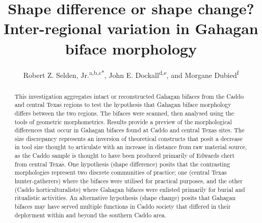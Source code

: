 \documentclass[review]{elsarticle}
\begin{document}
\begin{frontmatter}


\title{Shape difference or shape change? Inter-regional variation in Gahagan biface morphology}



\author{Robert Z. Selden, Jr.\textsuperscript{a,b,c*}, John E. Dockall\textsuperscript{d,e}, and Morgane Dubied\textsuperscript{f}}
\address[1]{Heritage Research Center, Stephen F. Austin State University, United States}
\address[2]{Cultural Heritage Department, Jean Monnet University, France}
\address[3]{ORCID ID \href{http://orcid.org/0000-0002-1789-8449}{0000-0002-1789-8449}}
\address[4]{Prewitt and Associates, Inc., United States}
\address[5]{ORCID ID \href{http://orcid.org/0000-0002-0940-7144}{0000-0002-0940-7144}}
\address[6]{UMR 6282, Laboratoire Biogéosciences, Université de Bourgogne, France}

\begin{abstract}
This investigation aggregates intact or reconstructed Gahagan bifaces from the Caddo and central Texas regions to test the hypothesis that Gahagan biface morphology differs between the two regions. The bifaces were scanned, then analysed using the tools of geometric morphometrics. Results provide a preview of the morphological differences that occur in Gahagan bifaces found at Caddo and central Texas sites. The size discrepancy represents an inversion of theoretical constructs that posit a decrease in tool size thought to articulate with an increase in distance from raw material source, as the Caddo sample is thought to have been produced primarily of Edwards chert from central Texas. One hypothesis (shape difference) posits that the contrasting morphologies represent two discrete communities of practice; one (central Texas hunter-gatherers) where the bifaces were utilised for practical purposes, and the other (Caddo horticulturalists) where Gahagan bifaces were enlisted primarily for burial and ritualistic activities. An alternative hypothesis (shape change) posits that Gahagan bifaces may have served multiple functions in Caddo society that differed in their deployment within and beyond the southern Caddo area.
\end{abstract}


\end{frontmatter}
\end{document}
